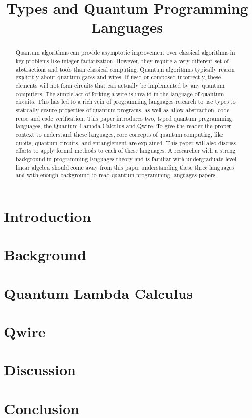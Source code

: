 \documentclass[acmsmall,screen,review]{acmart}
\newif\ifpaper \papertrue
\begin{document}
\title{Types and Quantum Programming Languages}
\begin{abstract}
Quantum algorithms can provide asymptotic improvement over classical algorithms in key problems like integer factorization.
However, they require a very different set of abstractions and tools than classical computing.
Quantum algorithms typically reason explicitly about quantum gates and wires.
If used or composed incorrectly, these elements will not form circuits that can actually be implemented by any quantum computers.
The simple act of forking a wire is invalid in the language of quantum circuits.
This has led to a rich vein of programming languages research to use types to statically ensure properties of quantum programs, as well as allow abstraction, code reuse and code verification.
This paper introduces two, typed quantum programming languages, the Quantum Lambda Calculus and Qwire.
To give the reader the proper context to understand these languages, core concepts of quantum computing, like qubits, quantum circuits, and entanglement are explained.
This paper will also discuss efforts to apply formal methods to each of these languages.
A researcher with a strong background in programming languages theory and is familiar with undergraduate level linear algebra should come away from this paper understanding these three languages and with enough background to read quantum programming languages papers.
\end{abstract}

\maketitle
\ifpaper

\section{Introduction}


\section{Background}
\label{sec:background}


\section{Quantum Lambda Calculus}


\section{Qwire}


\section{Discussion}


\section{Conclusion}


\else

\fi



\end{document}
